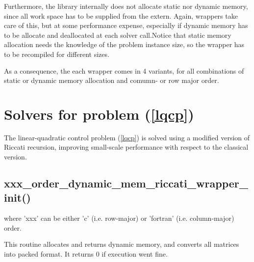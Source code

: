 \documentclass[a4paper]{report}
\begin{document}
Furthermore, the library internally does not allocate static nor dynamic memory, since all work space has to be supplied from the extern.
Again, wrappers take care of this, but at some performance expense, especially if dynamic memory has to be allocate and deallocated at each solver call.Notice that static memory allocation needs the knowledge of the problem instance size, so the wrapper has to be recompiled for different sizes.

As a consequence, the each wrapper comes in 4 variants, for all combinations of static or dynamic memory allocation and comumn- or row major order.

\section{Solvers for problem (\ref{lqcp})}

The linear-quadratic control problem (\ref{lqcp}) is solved using a modified version of Riccati recursion, improving small-scale performance with respect to the classical version.

\subsection{xxx\_order\_dynamic\_mem\_riccati\_wrapper\_init() } 
where 'xxx' can be either 'c' (i.e. row-major) or 'fortran' (i.e. column-major) order.

This routine allocates and returns dynamic memory, and converts all matrices into packed format.
It returns 0 if execution went fine.
\end{document}
